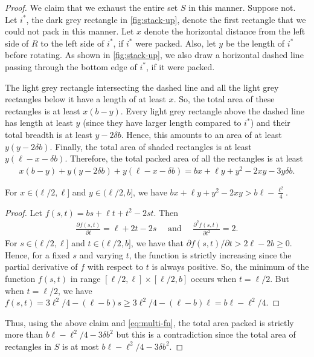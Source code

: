 \begin{proof}
We claim that we exhaust the
entire set $S$ in this manner. Suppose not. Let $i^*$, the dark grey rectangle in \cref{fig:stack-up}, denote the
first rectangle that we could not pack in this manner.
Let $x$ denote the horizontal distance from the left side of $R$ to the left side of $i^*$, if $i^*$ were packed. Also, let $y$
be the length of $i^*$ before rotating.
As shown in \cref{fig:stack-up}, we also draw a horizontal dashed line passing through the bottom edge of $i^*$, if it were packed.

The light grey rectangle intersecting the dashed line and all the light grey rectangles below it have a length of at least $x$.
So, the total area of these rectangles is at least $x(b-y)$. Every light grey rectangle above the dashed line has
length at least $y$ (since they have larger length compared to $i^*$)
and their total breadth is at least $y-2\delta b$. Hence, this amounts to an area of at least $y(y-2\delta b)$.
Finally, the total area of shaded rectangles is at least $y(\ell-x-\delta b)$. Therefore, the total packed area of all the rectangles
is at least
\begin{align}
x(b-y)+y(y-2\delta b)+y(\ell-x-\delta b)=bx+\ell y+y^2-2xy-3y\delta b.\label{eq:multi-fn}
\end{align}
\begin{claim}
\label{claim:ineq-x-y}
For $x\in(\ell/2,\ell]$ and $y\in(\ell/2,b]$, we have $bx+\ell y+y^2-2xy> b\ell-\frac{\ell^2}{4}$.
\end{claim}
\begin{proof}
Let $f(s,t)=bs+\ell t+t^2-2st$. Then
\begin{align*}
\frac{\partial f(s,t)}{\partial t}=\ell+2t-2s\quad\text{ and }\quad \frac{\partial^2 f(s,t)}{\partial t^2}=2.
\end{align*}
For $s\in(\ell/2,\ell]$ and $t\in(\ell/2,b]$, we have that $\partial f(s,t)/\partial t>2\ell-2b\ge  0$.
Hence, for a fixed $s$ and varying $t$, the function is strictly increasing since the partial derivative
of $f$ with respect to $t$ is always positive. So, the minimum of the function $f(s,t)$ in range
$[\ell/2,\ell]\times[\ell/2,b]$ occurs when $t=\ell/2$. But when $t=\ell/2$, we have $f(s,t)=3\ell^2/4-(\ell-b) s\ge 3\ell^2/4-(\ell-b)\ell=b\ell-\ell^2/4$.
\end{proof}
Thus, using the above claim and \cref{eq:multi-fn}, the total area packed is strictly more than $b\ell-\ell^2/4-3\delta b^2$ but this is a contradiction since the total area of
rectangles in $S$ is at most $b\ell-\ell^2/4-3\delta b^2$.
\end{proof}
